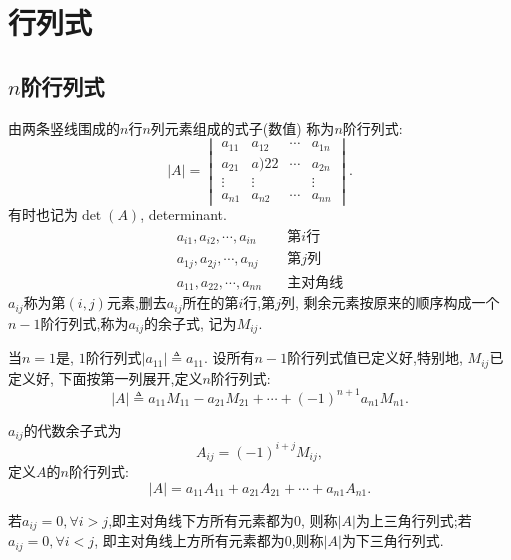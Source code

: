 \section{行列式}

\subsection{\texorpdfstring{$n$}{\textit{n}}阶行列式}
\begin{definition}\label{dfn:n-order-determinant1}
  由两条竖线围成的$n$行$n$列元素组成的式子(数值)
  称为$n$阶行列式:
  \[
    |A|=
    \begin{vmatrix}
      a_{11}&a_{12}&\cdots&a_{1n}\\
      a_{21}&a){22}&\cdots&a_{2n}\\
      \vdots&\vdots&&\vdots\\
      a_{n1}&a_{n2}&\cdots&a_{nn}
    \end{vmatrix}.
  \]
  有时也记为$\det(A)$, determinant.
  \begin{align*}
    a_{i1}, a_{i2},\cdots, a_{in} \quad & \text{第$i$行}\\
    a_{1j}, a_{2j},\cdots, a_{nj} \quad & \text{第$j$列}\\
    a_{11}, a_{22},\cdots, a_{nn} \quad & \text{主对角线}
  \end{align*}
  $a_{ij}$称为第$(i,j)$元素,删去$a_{ij}$所在的第$i$行,第$j$列,
  剩余元素按原来的顺序构成一个$n-1$阶行列式,称为$a_{ij}$的余子式,
  记为$M_{ij}$.
\end{definition}

\begin{definition}[递归定义]\label{dfn:n-order-determinant2}
  当$n=1$是, $1$阶行列式$|a_{11}| \triangleq a_{11}$.
  设所有$n-1$阶行列式值已定义好,特别地, $M_{ij}$已定义好,
  下面按第一列展开,定义$n$阶行列式:
  \[
    |A| \triangleq a_{11}M_{11}-a_{21}M_{21}+\cdots +(-1)^{n+1}a_{n1}M_{n1}.
  \]
\end{definition}

\begin{definition}\label{dfn:n-order-determinant3}
  $a_{ij}$的代数余子式为
  \[
    A_{ij} = (-1)^{i+j}M_{ij},
  \]
  定义$A$的$n$阶行列式:
  \[
    |A| = a_{11}A_{11}+a_{21}A_{21}+\cdots +a_{n1}A_{n1}.
  \]
\end{definition}

\begin{definition}\label{dfn:n-order-determinant4}
  若$a_{ij}=0, \forall i>j$,即主对角线下方所有元素都为$0$,
  则称$|A|$为上三角行列式;若$a_{ij}=0, \forall i<j$,
  即主对角线上方所有元素都为$0$,则称$|A|$为下三角行列式.
\end{definition}

